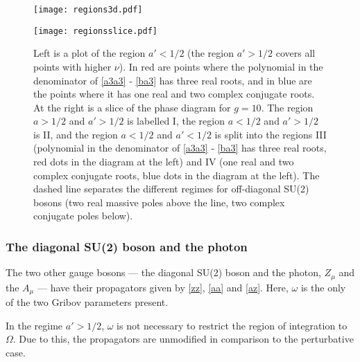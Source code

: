 \begin{figure}\begin{center}
\parbox{.5\textwidth}{\texttt{[image: regions3d.pdf]}} \quad \parbox{.4\textwidth}{\texttt{[image: regionsslice.pdf]}}
\caption{Left is a plot of the region $a'<1/2$ (the region $a'>1/2$ covers all points with higher $\nu$). In red are points where the polynomial in the denominator of \eqref{a3a3} - \eqref{ba3} has three real roots, and in blue are the points where it has one real and two complex conjugate roots. At the right is a slice of the phase diagram for $g=10$. The region $a>1/2$ and $a'>1/2$ is labelled I, the region $a<1/2$ and $a'>1/2$ is II, and the region $a<1/2$ and $a'<1/2$ is split into the regions III (polynomial in the denominator of \eqref{a3a3} - \eqref{ba3} has three real roots, red dots in the diagram at the left) and IV (one real and two complex conjugate roots, blue dots in the diagram at the left). The dashed line separates the different regimes for off-diagonal SU(2) bosons (two real massive poles above the line, two complex conjugate poles below). \label{regionsdiag}}
\end{center}\end{figure}















\subsubsection{The diagonal SU(2) boson and the photon} \label{zandgamma}
The two other gauge bosons --- the diagonal SU(2) boson and the photon, $Z_\mu$ and the $A_\mu$ --- have their propagators given by \eqref{zz}, \eqref{aa} and \eqref{az}. Here, $\omega$ is the only of the two Gribov parameters present.

In the regime $a'>1/2$, $\omega$ is not necessary to restrict the region of integration to $\Omega$. Due to this, the propagators are unmodified in comparison to the perturbative case.

